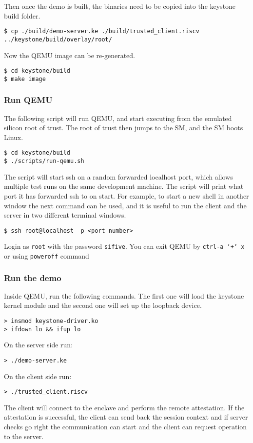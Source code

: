Then once the demo is built, the binaries need to be copied into the keystone build folder.

\begin{lstlisting}[frame=single]
$ cp ./build/demo-server.ke ./build/trusted_client.riscv ../keystone/build/overlay/root/
\end{lstlisting}
Now the QEMU image can be re-generated.

\begin{lstlisting}[frame=single]
$ cd keystone/build
$ make image
\end{lstlisting}

\subsubsection{Run QEMU}
The following script will run QEMU, and start executing from the emulated silicon root of trust. The root of trust then jumps to the SM, and the SM boots Linux. 
\begin{lstlisting}[frame=single]
$ cd keystone/build
$ ./scripts/run-qemu.sh
\end{lstlisting}
The script will start ssh on a random forwarded localhost port, which allows multiple test runs on the same development machine. The script will print what port it has forwarded ssh to on start. For example, to start a new shell in another window the next command can be used, and it is useful to run the client and the server in two different terminal windows. 
\begin{lstlisting}[frame=single]
$ ssh root@localhost -p <port number>
\end{lstlisting}
Login as \texttt{\color{RedOrange}root} with the password \texttt{\color{RedOrange}sifive}. You can exit QEMU by \texttt{\color{RedOrange}ctrl-a\ `+`\ x} or using  \texttt{\color{RedOrange}poweroff}  command

\subsubsection{Run the demo}
Inside QEMU, run the following commands. The first one will load the keystone kernel module and the second one will set up the loopback device. 
\begin{lstlisting}[frame=single]
> insmod keystone-driver.ko 
> ifdown lo && ifup lo           
\end{lstlisting}
On the server side run: 
\begin{lstlisting}[frame=single]
> ./demo-server.ke         
\end{lstlisting}
On the client side run:
\begin{lstlisting}[frame=single]
> ./trusted_client.riscv         
\end{lstlisting}
The client will connect to the enclave and perform the remote attestation. If the attestation is successful, the client can send back the session context and if server checks go right the communication can start and the client can request operation to the server. 

